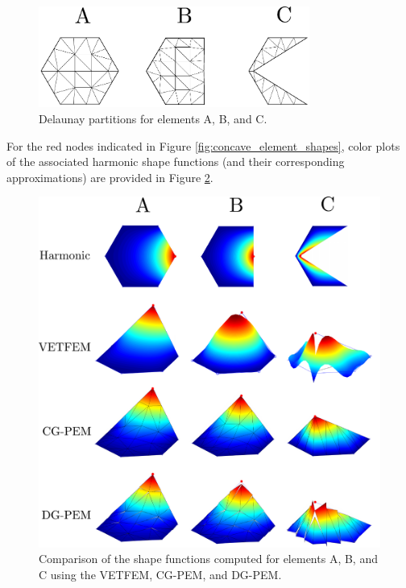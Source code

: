 \begin{figure}[!h]
  \centering
  \includegraphics[width=3.5in]{figures/concave_element_partitions.pdf}  \caption{Delaunay partitions for elements A, B, and C.}
  \label{fig:concave_element_partitions}
\end{figure}

For the red nodes indicated in Figure \ref{fig:concave_element_shapes}, color plots of the associated harmonic shape functions (and their corresponding approximations) are provided in Figure \ref{fig:concave_element_comparison}.

\begin{figure}[!h]
  \centering
  \includegraphics[width=5.0in]{figures/concave_element_comparison.pdf}  \caption{Comparison of the shape functions computed for elements A, B, and C using the VETFEM, CG-PEM, and DG-PEM.}
  \label{fig:concave_element_comparison}
\end{figure}

